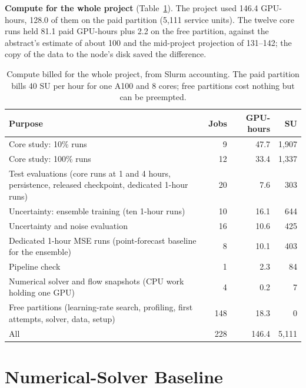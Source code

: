 \documentclass[11pt]{article}
\begin{document}
\textbf{Compute for the whole project} (Table~\ref{tab:compute}). The project used 146.4 GPU-hours, 128.0 of them on
the paid partition (5,111 service units). The twelve core runs held 81.1 paid GPU-hours plus 2.2 on the free
partition, against the abstract's estimate of about 100 and the mid-project projection of 131--142; the copy of the
data to the node's disk saved the difference.

\begin{table}[!htbp]
\centering\footnotesize
\begin{tabularx}{\linewidth}{@{}>{\raggedright\arraybackslash}Xrrr@{}}
\toprule
Purpose & Jobs & GPU-hours & SU \\
\midrule
Core study: 10\% runs & 9 & 47.7 & 1,907 \\
Core study: 100\% runs & 12 & 33.4 & 1,337 \\
Test evaluations (core runs at 1 and 4 hours, persistence, released checkpoint, dedicated 1-hour runs) & 20 & 7.6 & 303 \\
Uncertainty: ensemble training (ten 1-hour runs) & 10 & 16.1 & 644 \\
Uncertainty and noise evaluation & 16 & 10.6 & 425 \\
Dedicated 1-hour MSE runs (point-forecast baseline for the ensemble) & 8 & 10.1 & 403 \\
Pipeline check & 1 & 2.3 & 84 \\
Numerical solver and flow snapshots (CPU work holding one GPU) & 4 & 0.2 & 7 \\
Free partitions (learning-rate search, profiling, first attempts, solver, data, setup) & 148 & 18.3 & 0 \\
\midrule
All & 228 & 146.4 & 5,111 \\
\bottomrule
\end{tabularx}
\caption{Compute billed for the whole project, from Slurm accounting. The paid partition bills 40 SU per hour for one
A100 and 8 cores; free partitions cost nothing but can be preempted.}
\label{tab:compute}
\end{table}

\section{Numerical-Solver Baseline}
\label{sec:solver}
\end{document}
